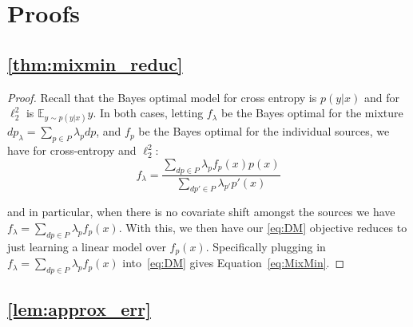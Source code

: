 \section{Proofs}
\label{app:proofs}

\subsection{\cref{thm:mixmin_reduc}}
\label{app:proof_mixmin}
\begin{proof}
        Recall that the Bayes optimal model for cross entropy is $p(y|x)$ and for $\ell_2^2$ is $\mathbb{E}_{y \sim p(y|x)} y$. In both cases, letting $f_{\lambda}$ be the Bayes optimal for the mixture $dp_{\lambda} = \sum_{p\in P} \lambda_{p} dp$, and $f_p$ be the Bayes optimal for the individual sources, we have for cross-entropy and $\ell_2^2$: $$f_{\lambda} = \frac{\sum_{dp \in P} \lambda_p f_p(x) p(x)}{\sum_{dp' \in P} \lambda_{p'} p'(x)}$$

    and in particular, when there is no covariate shift amongst the sources we have $f_{\lambda} = \sum_{dp \in P} \lambda_p f_p(x)$. With this, we then have our \ref{eq:DM} objective reduces to just learning a linear model over $f_p(x)$. Specifically plugging in $f_{\lambda} = \sum_{dp \in P} \lambda_p f_p(x)$ into~\ref{eq:DM} gives Equation~\ref{eq:MixMin}.
\end{proof}

\subsection{\cref{lem:approx_err}}
\label{app:proof_approx}

